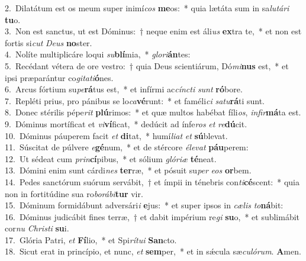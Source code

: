{2.~}Dilatátum est os meum super inimí\textit{cos} \textbf{me}os:~* quia lætáta sum in sa\textit{lu}\textit{tá}\textit{ri} \textbf{tu}o.\\
{3.~}Non est sanctus, ut est Dóminus:~† neque enim est áli\textit{us} \textbf{ex}tra te,~* et non est fortis si\textit{cut} \textit{De}\textit{us} \textbf{no}ster.\\
{4.~}Nolíte multiplicáre loqui \textit{su}\textbf{blí}mia,~* \textit{glo}\textit{ri}\textbf{án}tes:\\
{5.~}Recédant vétera de ore vestro:~† quia Deus scientiárum, Dó\textit{mi}\textbf{nus} est,~* et ipsi præparántur co\textit{gi}\textit{ta}\textit{ti}\textbf{ó}nes.\\
{6.~}Arcus fórtium su\textit{pe}\textbf{rá}tus est,~* et infírmi ac\textit{cín}\textit{cti} \textit{sunt} \textbf{ró}bore.\\
{7.~}Repléti prius, pro pánibus se lo\textit{ca}\textbf{vé}runt:~* et faméli\textit{ci} \textit{sa}\textit{tu}\textbf{rá}ti sunt.\\
{8.~}Donec stérilis pépe\textit{rit} \textbf{plú}rimos:~* et quæ multos habébat fíli\textit{os}, \textit{in}\textit{fir}\textbf{má}ta est.\\
{9.~}Dóminus mortíficat et \textit{vi}\textbf{ví}ficat,~* dedúcit ad ínfe\textit{ros} \textit{et} \textit{re}\textbf{dú}cit.\\
{10.~}Dóminus páuperem facit \textit{et} \textbf{di}tat,~* humí\textit{li}\textit{at} \textit{et} \textbf{sú}blevat.\\
{11.~}Súscitat de púlvere \textit{e}\textbf{gé}num,~* et de stércore \textit{é}\textit{le}\textit{vat} \textbf{páu}perem:\\
{12.~}Ut sédeat cum \textit{prin}\textbf{cí}pibus,~* et sólium \textit{gló}\textit{ri}\textit{æ} \textbf{té}neat.\\
{13.~}Dómini enim sunt cárdi\textit{nes} \textbf{ter}ræ,~* et pósuit su\textit{per} \textit{e}\textit{os} \textbf{or}bem.\\
{14.~}Pedes sanctórum suórum servábit,~† et ímpii in ténebris con\textit{ti}\textbf{cé}scent:~* quia non in fortitúdine sua ro\textit{bo}\textit{rá}\textit{bi}\textbf{tur} vir.\\
{15.~}Dóminum formidábunt adversári\textit{i} \textbf{e}jus:~* et super ipsos in \textit{cæ}\textit{lis} \textit{to}\textbf{ná}bit:\\
{16.~}Dóminus judicábit fines terræ,~† et dabit impérium re\textit{gi} \textbf{su}o,~* et sublimábit cor\textit{nu} \textit{Chri}\textit{sti} \textbf{su}i.\\
{17.~}Glória Patri, \textit{et} \textbf{Fí}lio,~* et Spi\textit{rí}\textit{tu}\textit{i} \textbf{San}cto.\\
{18.~}Sicut erat in princípio, et nunc, \textit{et} \textbf{sem}per,~* et in sǽcula sæ\textit{cu}\textit{ló}\textit{rum}. \textbf{A}men.\\
